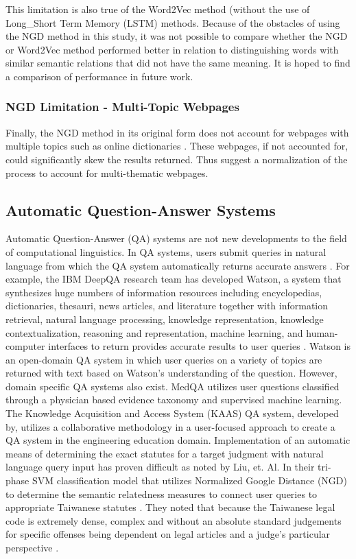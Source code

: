\documentclass[11pt]{article}
\begin{document}
This limitation is also true of the Word2Vec method (without the use of Long\_Short Term Memory (LSTM) methods.  Because of the obstacles of using the NGD method in this study, it was not possible to compare whether the NGD or Word2Vec method performed better in relation to distinguishing words with similar semantic relations that did not have the same meaning.  It is hoped to find a comparison of performance in future work.

\subsubsection{NGD Limitation - Multi-Topic Webpages}
Finally, the NGD method in its original form does not account for webpages with multiple topics such as online dictionaries \cite{KjosEvangelista2009}.    These webpages, if not accounted for, could significantly skew the results returned.  Thus \cite{KjosEvangelista2009} suggest a normalization of the process to account for multi-thematic webpages.
\subsection{Automatic Question-Answer Systems}
Automatic Question-Answer (QA) systems are not new developments to the field of computational linguistics. In QA systems, users submit queries in natural language from which the QA system automatically returns accurate answers \cite[p.~197]{LiuChenHo2015}. For example, the IBM DeepQA research team has developed Watson, a system that synthesizes huge numbers of information resources including encyclopedias, dictionaries, thesauri, news articles, and literature together with information retrieval, natural language processing, knowledge representation, knowledge contextualization, reasoning and representation, machine learning, and human-computer interfaces to return provides accurate results to user queries \cite{FerrucciBrownChuFan2011}. Watson is an open-domain QA system in which user queries on a variety of topics are returned with text based on Watson’s understanding of the question. However, domain specific QA systems also exist. MedQA \cite{LeeCiminoZhuSable2006} utilizes user questions classified through a physician based evidence taxonomy  and supervised machine learning.  The Knowledge Acquisition and Access System (KAAS) QA system, developed by\cite{diekerma2004evaluation}, utilizes a collaborative methodology in a user-focused approach to create a QA system in the engineering education domain. Implementation of an automatic means of determining  the exact statutes for a target judgment with natural language query input has proven difficult as noted by Liu, et. Al. In their tri-phase SVM classification model that utilizes Normalized Google Distance (NGD) to determine the semantic relatedness measures to connect user queries to appropriate Taiwanese statutes \cite[p.~196]{LiuChenHo2015}. They noted that because the Taiwanese legal code is extremely dense, complex  and without an absolute standard  judgements for specific offenses being dependent on legal articles and a judge’s particular perspective \cite[p.~198]{LiuChenHo2015}. 
\end{document}
